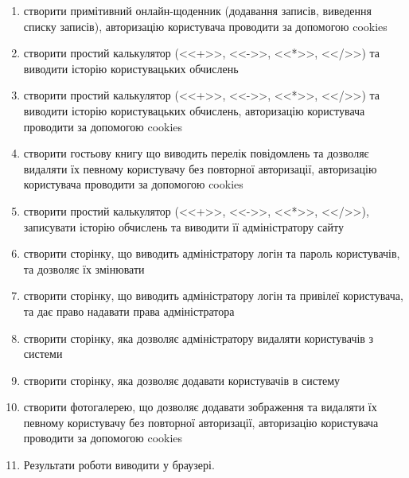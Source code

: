 \begin{enumerate}
\item створити примітивний онлайн-щоденник (додавання записів, виведення списку записів), авторизацію користувача проводити за допомогою cookies
\item створити простий калькулятор (<<+>>, <<->>, <<*>>, <</>>) та виводити історію користувацьких обчислень 
\item створити простий калькулятор (<<+>>, <<->>, <<*>>, <</>>) та виводити історію користувацьких обчислень, авторизацію користувача проводити за допомогою cookies
\item створити гостьову книгу що виводить перелік повідомлень та дозволяє видаляти їх певному користувачу без повторної авторизації, авторизацію користувача проводити за допомогою cookies
\item створити простий калькулятор (<<+>>, <<->>, <<*>>, <</>>), записувати історію обчислень та виводити її адміністратору сайту
\item створити сторінку, що виводить адміністратору логін та пароль користувачів, та дозволяє їх змінювати 
\item створити сторінку, що виводить адміністратору логін та привілеї користувача, та дає право надавати права адміністратора
\item створити сторінку, яка дозволяє адміністратору видаляти користувачів з системи
\item створити сторінку, яка дозволяє додавати користувачів в систему
\item  створити фотогалерею, що дозволяє додавати зображення та видаляти їх певному користувачу без повторної авторизації, авторизацію користувача проводити за допомогою cookies
\item[]Результати роботи виводити у браузері.

\end{enumerate}


